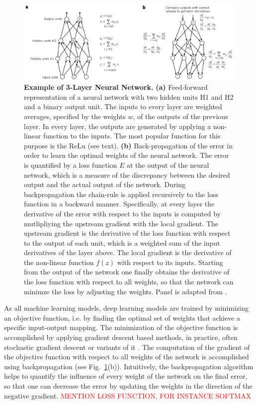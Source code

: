 \begin{figure}[h!]
	\centering
	\captionsetup{width=1\linewidth}
	\includegraphics[width=1\textwidth]{Figures/simple_neural_net.pdf}
	\caption{\textbf{Example of 3-Layer Neural Network.} \textbf{(a)} Feed-forward representation of a neural network with two hidden units H1 and H2 and a binary output unit. The inputs to every layer are weighted averages, specified by the weights $w$, of the outputs of the previous layer. In every layer, the outputs are generated by applying a non-linear function to the inputs. The most popular function for this purpose is the ReLu (see text). \textbf{(b)} Back-propagation of the error in order to learn the optimal weights of the neural network. The error is quantified by a loss function $E$ at the output of the neural network, which is a measure of the discrepancy between the desired output and the actual output of the network. During backpropagation the chain-rule is applied recursively to the loss function in a backward manner. Specifically, at every layer the derivative of the error with respect to the inputs is computed by mutlipliying the upstream gradient with the local gradient. The upstream gradient is the derivative of the loss function with respect to the output of each unit, which is a weighted sum of the input derivatives of the layer above. The local gradient is the derivative of the non-linear function $f(z)$ with respect to its inputs. Starting from the output of the network one finally obtains the derivative of the loss function with respect to all weights, so that the network can minimze the loss by adjusting the weights. Panel is adapted from \parencite{lecun2015}.}
	\label{fig:simple_neural_net}
\end{figure}

As all machine learning models, deep learning models are trained by minimizing an objective function, i.e. by finding the optimal set of weights that achieve a specific input-output mapping. The minimization of the objective function is accomplished by applying gradient descent based methods, in practice, often  stochastic gradient descent \parencite{bottou2008} or variants of it \parencite{diederik2015}. The computation of the gradient of the objective function with respect to all weights of the network is accomplished using backpropagation \parencite{rumelhart1986} (see Fig.~\ref{fig:simple_neural_net}(b)).
Intuitively, the backpropagation algorithm helps to quantify the influence of every weight of the network on the final error, so that one can decrease the error by updating the weights in the direction of the negative gradient. \textcolor{red}{MENTION LOSS FUNCTION, FOR INSTANCE SOFTMAX}

